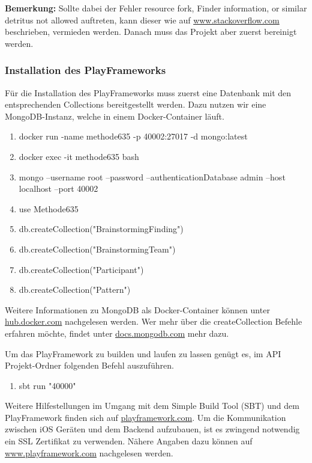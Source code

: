 \textbf{Bemerkung:} Sollte dabei der Fehler \grqq resource fork, Finder information, or similar detritus not allowed\grqq{} auftreten, kann dieser wie auf \href{https://stackoverflow.com/questions/39652867/code-sign-error-in-macos-high-sierra-xcode-resource-fork-finder-information}{www.stackoverflow.com} beschrieben, vermieden werden. Danach muss das Projekt aber zuerst bereinigt werden.

\subsubsection*{Installation des PlayFrameworks}
Für die Installation des PlayFrameworks muss zuerst eine Datenbank mit den entsprechenden Collections bereitgestellt werden. Dazu nutzen wir eine MongoDB-Instanz, welche in einem Docker-Container läuft.

\begin{enumerate}
  \item docker run -name methode635 -p 40002:27017 -d mongo:latest
  \item docker exec -it methode635 bash
  \item mongo --username root --password --authenticationDatabase admin --host localhost --port 40002
  \item use Methode635
  \item db.createCollection("BrainstormingFinding")
  \item db.createCollection("BrainstormingTeam")
  \item db.createCollection("Participant")
  \item db.createCollection("Pattern")
\end{enumerate}

Weitere Informationen zu MongoDB als Docker-Container können unter \href{https://hub.docker.com/_/mongo/}{hub.docker.com} nachgelesen werden. Wer mehr über die createCollection Befehle erfahren möchte, findet unter \href{https://docs.mongodb.com/manual/reference/method/db.createCollection/index.html}{docs.mongodb.com} mehr dazu.

Um das PlayFramework zu builden und laufen zu lassen genügt es, im API Projekt-Ordner folgenden Befehl auszuführen.

\begin{enumerate}
  \item sbt run "40000"
\end{enumerate}

Weitere Hilfestellungen im Umgang mit dem Simple Build Tool (SBT) und dem PlayFramework finden sich auf \href{https://www.playframework.com/documentation/2.6.x/PlayConsole}{playframework.com}. Um die Kommunikation zwischen iOS Geräten und dem Backend aufzubauen, ist es zwingend notwendig ein SSL Zertifikat zu verwenden. Nähere Angaben dazu können auf \href{https://www.playframework.com/documentation/2.6.x/ConfiguringHttps#SSL-Certificates}{www.playframework.com} nachgelesen werden.


